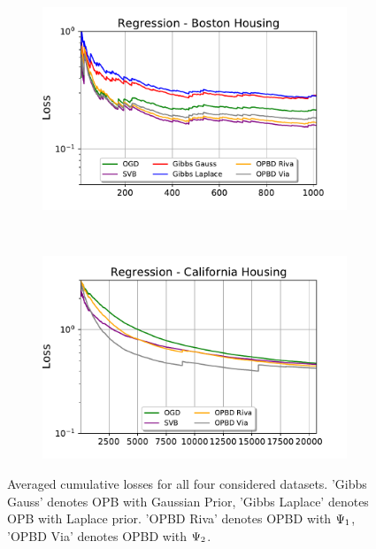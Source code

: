\begin{figure}
\begin{subfigure}[b]{0.45\textwidth}
 \end{subfigure}\\
 \begin{subfigure}[b]{0.45\textwidth}
   \centering
   \includegraphics[width=\textwidth]{chapter_3/figures/reg_boston}
\end{subfigure}~
\begin{subfigure}[b]{0.45\textwidth}
  \centering
  \includegraphics[width=\textwidth]{chapter_3/figures/reg_california}
\end{subfigure}
\caption{Averaged cumulative losses for all four considered datasets. 'Gibbs Gauss' denotes OPB with Gaussian Prior, 'Gibbs Laplace' denotes OPB with Laplace prior. 'OPBD Riva' denotes OPBD with $\Psi_{\normalfont1}$, 'OPBD Via' denotes OPBD with $\Psi_{\normalfont2}$. }
\label{fig: exp_results}
 \end{figure}


